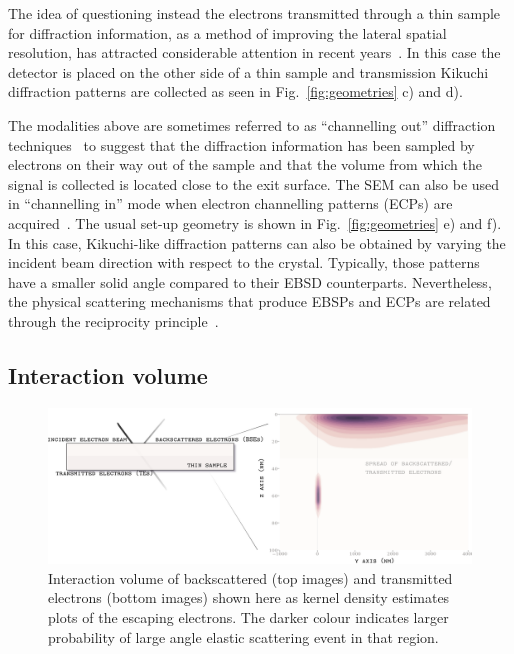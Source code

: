 The idea of questioning instead the electrons transmitted through a thin sample for diffraction information, as a method of improving the lateral spatial resolution, has attracted considerable attention in recent years~\cite{Trimby12,Keller12}. In this case the detector is placed on the other side of a thin sample and transmission Kikuchi diffraction patterns are collected as seen in Fig.~\ref{fig:geometries} c) and d).


The modalities above are sometimes referred to as ``channelling out'' diffraction techniques~\cite{joy1994} to suggest that the diffraction information has been sampled by electrons on their way out of the sample and that the volume from which the signal is collected is located close to the exit surface. The SEM can also be used in ``channelling in'' mode when electron channelling patterns (ECPs) are acquired~\cite{Coates67,Joy82}. The usual set-up  geometry is shown in Fig.~\ref{fig:geometries} e) and f). In this case, Kikuchi-like diffraction patterns can also be obtained by varying the incident beam direction with respect to the crystal. Typically, those patterns have a smaller solid angle compared to their EBSD counterparts. Nevertheless, the physical scattering mechanisms that produce EBSPs and ECPs are related through the reciprocity principle~\cite{reimerSEM}.

\subsection{Interaction volume}


\begin{figure}[ht]
\centering
\includegraphics[width=1.1\linewidth]{Figures/TKDpendepth.png}
\caption[Interaction volume]{Interaction volume of backscattered (top images) and transmitted electrons (bottom images) shown here as kernel density estimates plots of the escaping electrons. The darker colour indicates larger probability of large angle elastic scattering event in that region.}
\label{fig:intvolume}
\end{figure}



